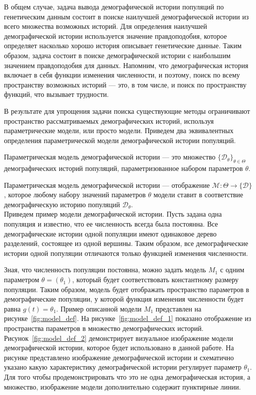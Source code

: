 В общем случае, задача вывода демографической истории популяций по генетическим данным состоит в поиске наилучшей демографической истории из всего множества возможных историй.
Для определения наилучшей демографической истории используется значение правдоподобия, которое определяет насколько хорошо история описывает генетические данные.
Таким образом, задача состоит в поиске демографической истории с наибольшим значением правдоподобия для данных.
Напомним, что демографическая история включает в себя функции изменения численности, и поэтому, поиск по всему пространству возможных историй --- это, в том числе, и поиск по пространству функций, что вызывает трудности.

В результате для упрощения задачи поиска существующие методы ограничивают пространство рассматриваемых демографических историй, используя параметрические модели, или просто модели.
Приведем два эквивалентных определения параметрической модели демографической истории популяций.

 Параметрическая модель демографической истории --- это множество $\{\mathcal{D}_\theta\}_{\theta \in \Theta}$ демографических историй популяций, параметризованное набором параметров $\theta$.

 Параметрическая модель демографической истории --- отображение $\mathcal{M}: \Theta \to \{\mathcal{D}\}$, которое любому набору значений параметров $\theta$ модели ставит в соответствие демографическую историю популяций $\mathcal{D}_\theta$.\\

Приведем пример модели демографической истории.
Пусть задана одна популяция и известно, что ее численность всегда была постоянна.
Все демографические истории одной популяции имеют одинаковое дерево разделений, состоящее из одной вершины.
Таким образом, все демографические истории одной популяции отличаются только функцией изменения численности.

Зная, что численность популяции постоянна, можно задать модель $M_1$ с одним параметром $\theta = (\theta_1)$, который будет соответствовать константному размеру популяции.
Таким образом, модель будет отображать пространство параметров в демографические популяции, у которой функция изменения численности будет равна $g(t) = \theta_1$.
Пример описанной модели $M_1$ представлен на рисунке~\ref{fig:model_def}.
На рисунке~\ref{fig:model_def_1} показано отображение из пространства параметров в множество демографических историй.
Рисунок~\ref{fig:model_def_2} демонстрирует визуальное изображение модели демографической истории, которое будет использовано в данной работе.
На рисунке представлено изображение демографической истории и схематично указано какую характеристику демографической истории регулирует параметр $\theta_1$.
Для того чтобы продемонстрировать что это не одна демографическая история, а множество, изображение модели дополнительно содержит пунктирные линии.

